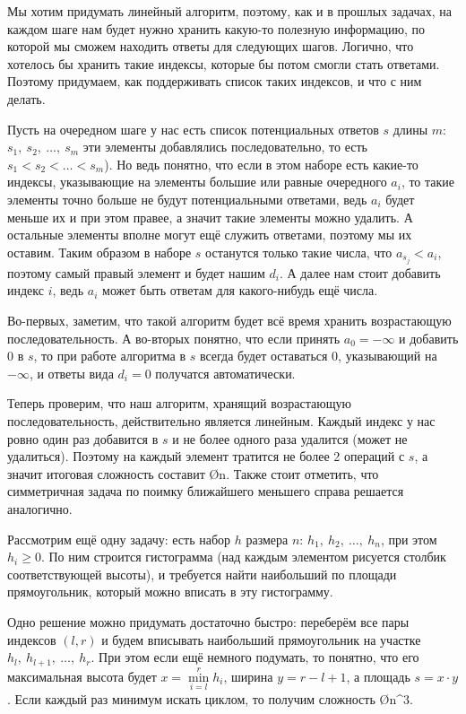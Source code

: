 Мы хотим придумать линейный алгоритм, поэтому, как и в прошлых задачах, на каждом шаге нам будет нужно хранить какую-то полезную информацию, по которой мы сможем находить ответы для следующих шагов. Логично, что хотелось бы хранить такие индексы, которые бы потом смогли стать ответами. Поэтому придумаем, как поддерживать список таких индексов, и что с ним делать.

Пусть на очередном шаге у нас есть список потенциальных ответов $s$ длины $m$: $s_1,\ s_2,\ \ldots,\ s_m$ эти элементы добавлялись последовательно, то есть $s_1 < s_2 < \ldots < s_m$). Но ведь понятно, что если в этом наборе есть какие-то индексы, указывающие на элементы большие или равные очередного $a_i$, то такие элементы точно больше не будут потенциальными ответами, ведь $a_i$ будет меньше их и при этом правее, а значит такие элементы можно удалить. А остальные элементы вполне могут ещё служить ответами, поэтому мы их оставим. Таким образом в наборе $s$ останутся только такие числа, что $a_{s_j} < a_i$, поэтому самый правый элемент и будет нашим $d_i$. А далее нам стоит добавить индекс $i$, ведь $a_i$ может быть ответам для какого-нибудь ещё числа.

Во-первых, заметим, что такой алгоритм будет всё время хранить возрастающую последовательность. А во-вторых понятно, что если принять $a_0 = -\infty$ и добавить $0$ в $s$, то при работе алгоритма в $s$ всегда будет оставаться $0$, указывающий на $-\infty$, и ответы вида $d_i = 0$ получатся автоматически.

Теперь проверим, что наш алгоритм, хранящий возрастающую последовательность, действительно является линейным. Каждый индекс у нас ровно один раз добавится в $s$ и не более одного раза удалится (может не удалиться). Поэтому на каждый элемент тратится не более 2 операций с $s$, а значит итоговая сложность составит \O{n}. Также стоит отметить, что симметричная задача по поимку ближайшего меньшего справа решается аналогично.


Рассмотрим ещё одну задачу: есть набор $h$ размера $n$: $h_1,\ h_2,\ \ldots,\ h_n$, при этом $h_i \geq 0$. По ним строится гистограмма (над каждым элементом рисуется столбик соответствующей высоты), и требуется найти наибольший по площади прямоугольник, который можно вписать в эту гистограмму.

Одно решение можно придумать достаточно быстро: переберём все пары индексов $(l, r)$ и будем вписывать наибольший прямоугольник на участке $h_l,\ h_{l + 1},\ \ldots,\ h_r$. При этом если ещё немного подумать, то понятно, что его максимальная высота будет $x = \min\limits_{i = l}^{r} h_i$, ширина $y = r - l + 1$, а площадь $s = x \cdot y$. Если каждый раз минимум искать циклом, то получим сложность \O{n^3}.

